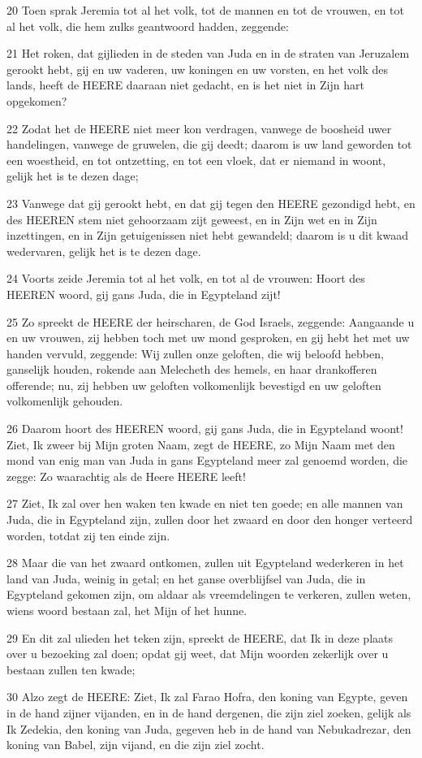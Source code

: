 \par 20 Toen sprak Jeremia tot al het volk, tot de mannen en tot de vrouwen, en tot al het volk, die hem zulks geantwoord hadden, zeggende:
\par 21 Het roken, dat gijlieden in de steden van Juda en in de straten van Jeruzalem gerookt hebt, gij en uw vaderen, uw koningen en uw vorsten, en het volk des lands, heeft de HEERE daaraan niet gedacht, en is het niet in Zijn hart opgekomen?
\par 22 Zodat het de HEERE niet meer kon verdragen, vanwege de boosheid uwer handelingen, vanwege de gruwelen, die gij deedt; daarom is uw land geworden tot een woestheid, en tot ontzetting, en tot een vloek, dat er niemand in woont, gelijk het is te dezen dage;
\par 23 Vanwege dat gij gerookt hebt, en dat gij tegen den HEERE gezondigd hebt, en des HEEREN stem niet gehoorzaam zijt geweest, en in Zijn wet en in Zijn inzettingen, en in Zijn getuigenissen niet hebt gewandeld; daarom is u dit kwaad wedervaren, gelijk het is te dezen dage.
\par 24 Voorts zeide Jeremia tot al het volk, en tot al de vrouwen: Hoort des HEEREN woord, gij gans Juda, die in Egypteland zijt!
\par 25 Zo spreekt de HEERE der heirscharen, de God Israels, zeggende: Aangaande u en uw vrouwen, zij hebben toch met uw mond gesproken, en gij hebt het met uw handen vervuld, zeggende: Wij zullen onze geloften, die wij beloofd hebben, ganselijk houden, rokende aan Melecheth des hemels, en haar drankofferen offerende; nu, zij hebben uw geloften volkomenlijk bevestigd en uw geloften volkomenlijk gehouden.
\par 26 Daarom hoort des HEEREN woord, gij gans Juda, die in Egypteland woont! Ziet, Ik zweer bij Mijn groten Naam, zegt de HEERE, zo Mijn Naam met den mond van enig man van Juda in gans Egypteland meer zal genoemd worden, die zegge: Zo waarachtig als de Heere HEERE leeft!
\par 27 Ziet, Ik zal over hen waken ten kwade en niet ten goede; en alle mannen van Juda, die in Egypteland zijn, zullen door het zwaard en door den honger verteerd worden, totdat zij ten einde zijn.
\par 28 Maar die van het zwaard ontkomen, zullen uit Egypteland wederkeren in het land van Juda, weinig in getal; en het ganse overblijfsel van Juda, die in Egypteland gekomen zijn, om aldaar als vreemdelingen te verkeren, zullen weten, wiens woord bestaan zal, het Mijn of het hunne.
\par 29 En dit zal ulieden het teken zijn, spreekt de HEERE, dat Ik in deze plaats over u bezoeking zal doen; opdat gij weet, dat Mijn woorden zekerlijk over u bestaan zullen ten kwade;
\par 30 Alzo zegt de HEERE: Ziet, Ik zal Farao Hofra, den koning van Egypte, geven in de hand zijner vijanden, en in de hand dergenen, die zijn ziel zoeken, gelijk als Ik Zedekia, den koning van Juda, gegeven heb in de hand van Nebukadrezar, den koning van Babel, zijn vijand, en die zijn ziel zocht.

